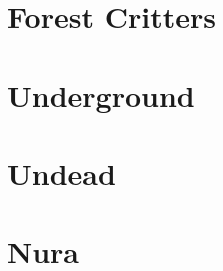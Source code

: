 \documentclass[a4paper,openany]{book}
\begin{document}
\section{Forest Critters}

\begin{multicols}{2}

\bear

\boar

\huntingdog

\cat

\chitincrawler

\basilisk

\end{multicols}

\section{Underground}

\begin{multicols}{2}

\umberhulk

\watcher

\jelly

\jelly

\jelly

\jelly

\end{multicols}

\section{Undead}

\begin{multicols}{2}

\ghoul

\ghast

\demilich

\lich

\end{multicols}

\section{Nura}
\end{document}

